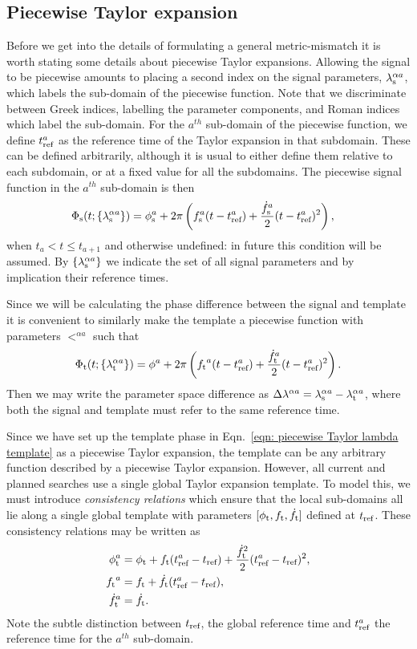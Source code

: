 \documentclass[../full_thesis/full_thesis.tex]{subfiles}
\begin{document}
\subsection{Piecewise Taylor expansion}
Before we get into the details of formulating a general metric-mismatch it is
worth stating some details about piecewise Taylor expansions.
Allowing the signal to be piecewise amounts to placing a second index on the
signal parameters, ${\lambda}_\textrm{s}^{\alpha a}$, which labels the sub-domain of the piecewise function.
Note that we discriminate between
Greek indices, labelling the parameter components, and Roman indices which
label the sub-domain.
For the $a^{th}$ sub-domain of the piecewise function, we define $t_{\textrm{ref}}^{a}$
as the reference time of the Taylor expansion in that subdomain. These can
be defined arbitrarily, although it is usual to either define them
relative to each subdomain, or at a fixed value for all the subdomains.
The piecewise signal function in the $a^{th}$ sub-domain is then
\begin{align}
\Phi_{\textrm{s}}(t; \{{\lambda}_\textrm{s}^{\alpha a}\}) & = \phi_{\textrm{s}}^a + 2\pi \left(f_{\textrm{s}}^a (t - t_{\textrm{ref}}^a)
+ \frac{\dot{f}_{\textrm{s}}^a}{2}(t - t_{\textrm{ref}}^a)^{2} \right),
\label{eqn: piecewise Taylor lambda signal}
\end{align}
when $t_{a} < t \le t_{a+1}$ and otherwise undefined: in future this condition will
be assumed.  By $\{{\lambda}_\textrm{s}^{\alpha a}\}$ we indicate the set of all signal
parameters and by implication their reference times.

Since we will be calculating the phase difference between the signal and template
it is convenient to similarly make the template a piecewise function with
parameters $\lt^{\alpha a}$ such that
\begin{align}
\Phi_{\textrm{t}}(t; \{{\lambda}_\textrm{t}^{\alpha a}\}) = \phi^a + 2\pi \left({f_{\textrm{t}}}^a (t - t_{\textrm{ref}}^a)
+ \frac{\dot{f}_{\textrm{t}}^a}{2}(t - t_{\textrm{ref}}^a)^{2} \right).
\label{eqn: piecewise Taylor lambda template}
\end{align}
Then we may write the parameter space difference as
$\Delta\lambda^{\alpha a} = {\lambda}_\textrm{s}^{\alpha a} - {\lambda}_\textrm{t}^{\alpha a}$, where both the signal and
template must refer to the same reference time.

Since we have set up the template phase in Eqn.~\eqref{eqn: piecewise Taylor
lambda template} as a piecewise Taylor expansion, the template can
be any arbitrary function described by a piecewise Taylor expansion. However,
all current and planned searches use a single global Taylor expansion template.
To model this, we must introduce \emph{consistency relations}
which ensure that the local sub-domains all lie along a single global template
with parameters $[\phi_{\textrm{t}}, {f_{\textrm{t}}}, \dot{f}_{\textrm{t}}]$ defined at $t_{\textrm{ref}}$. These consistency
relations may be written as
\begin{align}
\begin{split}
\phi_{\textrm{t}}^a & = \phi_{\textrm{t}} + {f_{\textrm{t}}}(t_{\textrm{ref}}^a - t_{\textrm{ref}}) + \frac{\dot{f}_{\textrm{t}}^{2}}{2}(t_{\textrm{ref}}^a - t_{\textrm{ref}})^{2}, \\
{f_{\textrm{t}}}^a & = {f_{\textrm{t}}} + \dot{f}_{\textrm{t}}(t_{\textrm{ref}}^a - t_{\textrm{ref}}), \\
\dot{f}_{\textrm{t}}^a & = \dot{f}_{\textrm{t}}.
\end{split}
\end{align}
Note the subtle distinction between $t_{\textrm{ref}}$, the global reference time and
$t_{\textrm{ref}}^{a}$ the reference time for the $a^{th}$ sub-domain.
\end{document}
